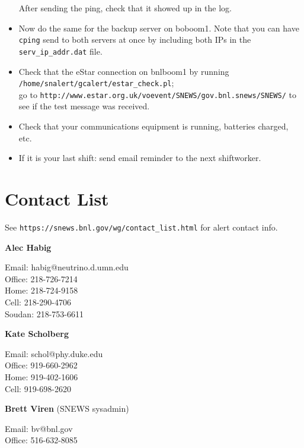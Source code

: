 \documentclass{article}
\begin{document}
\begin{itemize}
After sending the ping, check that it showed up in the log. 

\item Now do the same for the backup server on boboom1.  Note that you 
can have \texttt{cping}
send to both servers at once by including both IPs in the 
\texttt{serv\_ip\_addr.dat} file.

\item Check that the eStar connection on bnlboom1 by running\\
\texttt{/home/snalert/gcalert/estar\_check.pl};\\ go to
\texttt{http://www.estar.org.uk/voevent/SNEWS/gov.bnl.snews/SNEWS/} to see
if the test message was received.

\item Check that your communications equipment is running,
batteries charged, etc.

\item If it is your last shift: send email reminder to the
next shiftworker.

\end{itemize}

\newpage

\section{Contact List}      


See \texttt{https://snews.bnl.gov/wg/contact\_list.html} for 
alert contact info.\\
\vspace{0.05in}

\noindent
\textbf{Alec Habig}

\noindent
Email: habig@neutrino.d.umn.edu\\
Office: 218-726-7214\\
Home: 218-724-9158\\
Cell: 218-290-4706\\
Soudan: 218-753-6611\\

\vspace{0.05in}

\noindent
\textbf{Kate Scholberg}

\noindent
Email: schol@phy.duke.edu\\
Office: 919-660-2962\\
Home: 919-402-1606 \\
Cell: 919-698-2620\\

\vspace{0.05in}

\noindent
\textbf{Brett Viren} (SNEWS sysadmin)

\noindent
Email: bv@bnl.gov\\
Office: 516-632-8085\\
\end{document}
